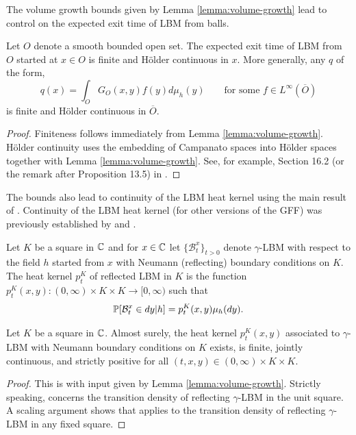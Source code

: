 \documentclass[12pt]{amsart}
\numberwithin{equation}{section}
\begin{document}
	The volume growth bounds given by Lemma \ref{lemma:volume-growth} lead to control 
	on the expected exit time of LBM from balls. 
	
	\begin{prop} \label{prop:lbm-exit-time}
		Let $O$ denote a smooth bounded open set. 
		The expected exit time of LBM from $O$ started at $x \in O$
		is finite and H\"{o}lder continuous in $x$.  More generally, any $q$ of the form,
		\[
		q(x) = \int_{O} G_{O}(x, y) f (y) d \mu_h(y) \qquad \mbox{for some $f \in L^{\infty}(\overline O)$}
		\]
		is finite and H\"{o}lder continuous in $\overline{O}$.
	\end{prop}
	\begin{proof}		
		Finiteness follows immediately from Lemma \ref{lemma:volume-growth}.
		H\"{o}lder continuity uses the embedding of Campanato spaces into H\"{o}lder spaces together with Lemma \ref{lemma:volume-growth}. 
		See, for example, Section 16.2 (or the remark after Proposition 13.5) in \cite{ponce2016elliptic}. 
	\end{proof}
	
	The bounds also lead to continuity of the LBM heat kernel using the main result of \cite{kigami2019}. 
	Continuity of the LBM heat kernel (for other versions of the GFF) was previously established by \cite{andres2016continuity}	and \cite{maillard2016liouville}. 
	
	
	
	Let $K$ be a square in $\mathbb{C}$ and for $x \in \mathbb{C}$ let $\{ \mathcal{B}_t^x\}_{t > 0}$ denote $\gamma$-LBM with respect to the field $h$ started from $x$ with Neumann (reflecting) boundary conditions on $K$. The heat kernel $p^K_t$ of reflected LBM in $K$ is the 
	function $p^K_t(x,y) : (0,\infty) \times K \times K \to [0,\infty)$ such that 
	\begin{equation} \label{eq:defining-property-of-kernel}
	\P[ \mathcal{B}_t^x \in dy | h] = p^K_t(x,y) \mu_h(dy). %
	\end{equation}
	
	
	
	
	
	\begin{prop} \label{prop:lbm-continuity}
		Let $K$ be a square in $\mathbb{C}$. Almost surely, the heat kernel $p^K_t(x,y)$ associated to $\gamma$-LBM with Neumann boundary conditions on $K$ exists, is finite, jointly continuous, and strictly positive for all $(t,x,y) \in (0,\infty) \times K \times K$. 
	\end{prop}
	\begin{proof}
		This is \cite[Theorem 13.1]{kigami2019}   with input given by Lemma \ref{lemma:volume-growth}.
		Strictly speaking, \cite[Theorem 13.1]{kigami2019}   concerns the transition density of reflecting $\gamma$-LBM in the unit square. A scaling argument shows that \cite[Theorem 13.1]{kigami2019} applies
		to the transition density of reflecting $\gamma$-LBM in any fixed square.
	\end{proof}
	
\end{document}
